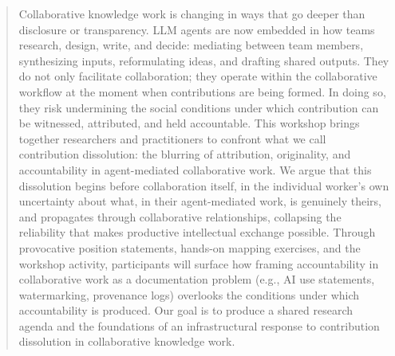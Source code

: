 \documentclass[manuscript,review]{acmart}
\begin{document}
\begin{abstract}
Collaborative knowledge work is changing in ways that go deeper than disclosure or transparency. LLM agents are now embedded in how teams research, design, write, and decide: mediating between team members, synthesizing inputs, reformulating ideas, and drafting shared outputs. They do not only facilitate collaboration; they operate within the collaborative workflow at the moment when contributions are being formed. In doing so, they risk undermining the social conditions under which contribution can be witnessed, attributed, and held accountable. This workshop brings together researchers and practitioners to confront what we call contribution dissolution: the blurring of attribution, originality, and accountability in agent-mediated collaborative work. We argue that this dissolution begins before collaboration itself, in the individual worker's own uncertainty about what, in their agent-mediated work, is genuinely theirs, and propagates through collaborative relationships, collapsing the reliability that makes productive intellectual exchange possible. Through provocative position statements, hands-on mapping exercises, and the workshop activity, participants will surface how framing accountability in collaborative work as a documentation problem (e.g., AI use statements, watermarking, provenance logs) overlooks the conditions under which accountability is produced. Our goal is to produce a shared research agenda and the foundations of an infrastructural response to contribution dissolution in collaborative knowledge work.
\end{abstract}







\maketitle
\end{document}
